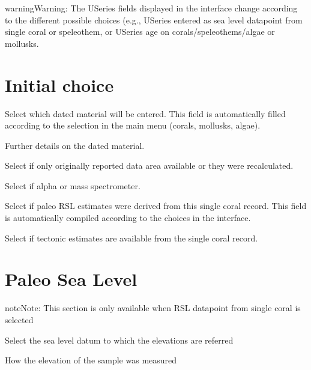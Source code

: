 \documentclass[letterpaper,10pt,english]{sphinxmanual}
\begin{document}
\begin{sphinxadmonition}{warning}{Warning:}
The U\sphinxhyphen{}Series fields displayed in the interface change according to the different possible choices (e.g., U\sphinxhyphen{}Series entered as sea level datapoint from single coral or speleothem, or U\sphinxhyphen{}Series age on corals/speleothems/algae or mollusks.
\end{sphinxadmonition}


\section{Initial choice}
\label{\detokenize{Useries:initial-choice}}
 \sphinxhyphen{} Select which dated material will be entered. This field is automatically filled according to the selection in the main menu (corals, mollusks, algae).

 \sphinxhyphen{} Further details on the dated material.

 \sphinxhyphen{} Select if only originally reported data area available or they were recalculated.

 \sphinxhyphen{} Select if alpha or mass spectrometer.

 \sphinxhyphen{} Select if paleo RSL estimates were derived from this single coral record. This field is automatically compiled according to the choices in the interface.

 \sphinxhyphen{} Select if tectonic estimates are available from the single coral record.


\section{Paleo Sea Level}
\label{\detokenize{Useries:paleo-sea-level}}
\begin{sphinxadmonition}{note}{Note:}
This section is only available when RSL datapoint from single coral is selected
\end{sphinxadmonition}

 \sphinxhyphen{} Select the sea level datum to which the elevations are referred

 \sphinxhyphen{} How the elevation of the sample was measured
\end{document}
